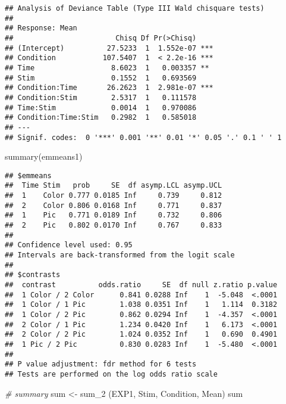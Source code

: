 \documentclass[
]{article}
\newenvironment{Shaded}{\begin{snugshade}}{\end{snugshade}}
\newcommand{\CommentTok}[1]{\textcolor[rgb]{0.56,0.35,0.01}{\textit{#1}}}
\newcommand{\FunctionTok}[1]{\textcolor[rgb]{0.00,0.00,0.00}{#1}}
\newcommand{\NormalTok}[1]{#1}
\newcommand{\OtherTok}[1]{\textcolor[rgb]{0.56,0.35,0.01}{#1}}
\newcommand{\StringTok}[1]{\textcolor[rgb]{0.31,0.60,0.02}{#1}}
\begin{document}
\begin{verbatim}
## Analysis of Deviance Table (Type III Wald chisquare tests)
## 
## Response: Mean
##                        Chisq Df Pr(>Chisq)    
## (Intercept)          27.5233  1  1.552e-07 ***
## Condition           107.5407  1  < 2.2e-16 ***
## Time                  8.6023  1   0.003357 ** 
## Stim                  0.1552  1   0.693569    
## Condition:Time       26.2623  1  2.981e-07 ***
## Condition:Stim        2.5317  1   0.111578    
## Time:Stim             0.0014  1   0.970086    
## Condition:Time:Stim   0.2982  1   0.585018    
## ---
## Signif. codes:  0 '***' 0.001 '**' 0.01 '*' 0.05 '.' 0.1 ' ' 1
\end{verbatim}

\begin{Shaded}
\begin{Highlighting}[]
\FunctionTok{summary}\NormalTok{(emmeans1)}
\end{Highlighting}
\end{Shaded}

\begin{verbatim}
## $emmeans
##  Time Stim   prob     SE  df asymp.LCL asymp.UCL
##  1    Color 0.777 0.0185 Inf     0.739     0.812
##  2    Color 0.806 0.0168 Inf     0.771     0.837
##  1    Pic   0.771 0.0189 Inf     0.732     0.806
##  2    Pic   0.802 0.0170 Inf     0.767     0.833
## 
## Confidence level used: 0.95 
## Intervals are back-transformed from the logit scale 
## 
## $contrasts
##  contrast          odds.ratio     SE  df null z.ratio p.value
##  1 Color / 2 Color      0.841 0.0288 Inf    1  -5.048  <.0001
##  1 Color / 1 Pic        1.038 0.0351 Inf    1   1.114  0.3182
##  1 Color / 2 Pic        0.862 0.0294 Inf    1  -4.357  <.0001
##  2 Color / 1 Pic        1.234 0.0420 Inf    1   6.173  <.0001
##  2 Color / 2 Pic        1.024 0.0352 Inf    1   0.690  0.4901
##  1 Pic / 2 Pic          0.830 0.0283 Inf    1  -5.480  <.0001
## 
## P value adjustment: fdr method for 6 tests 
## Tests are performed on the log odds ratio scale
\end{verbatim}

\begin{Shaded}
\begin{Highlighting}[]
\CommentTok{\# summary}
\NormalTok{sum }\OtherTok{\textless{}{-}} \FunctionTok{sum\_2}\NormalTok{ (EXP1, }\StringTok{\textquotesingle{}Stim\textquotesingle{}}\NormalTok{, }\StringTok{\textquotesingle{}Condition\textquotesingle{}}\NormalTok{, }\StringTok{\textquotesingle{}Mean\textquotesingle{}}\NormalTok{)}
\NormalTok{sum}
\end{Highlighting}
\end{Shaded}
\end{document}
